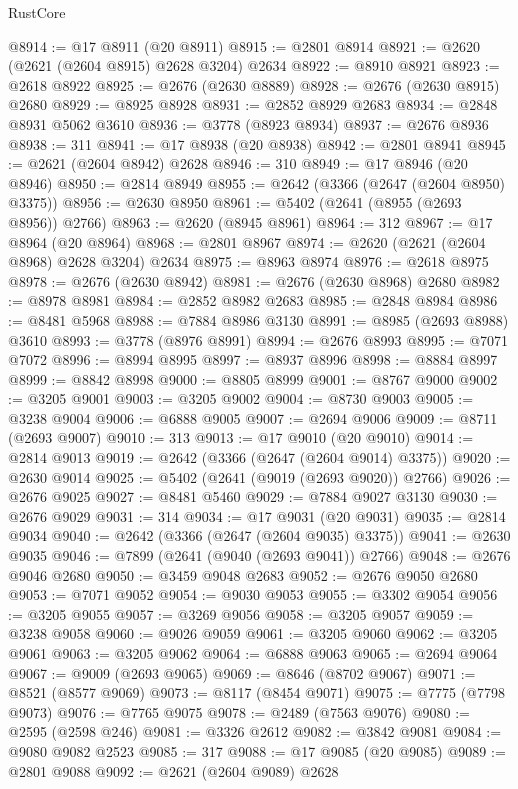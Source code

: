 \begin{lexlean}{RustCore}
\begin{coremodule}
@8914 := @17 @8911 (@20 @8911)
@8915 := @2801 @8914
@8921 := @2620 (@2621 (@2604 @8915) @2628 @3204) @2634
@8922 := @8910 @8921
@8923 := @2618 @8922
@8925 := @2676 (@2630 @8889)
@8928 := @2676 (@2630 @8915) @2680
@8929 := @8925 @8928
@8931 := @2852 @8929 @2683
@8934 := @2848 @8931 @5062 @3610
@8936 := @3778 (@8923 @8934)
@8937 := @2676 @8936
@8938 := 311
@8941 := @17 @8938 (@20 @8938)
@8942 := @2801 @8941
@8945 := @2621 (@2604 @8942) @2628
@8946 := 310
@8949 := @17 @8946 (@20 @8946)
@8950 := @2814 @8949
@8955 := @2642 (@3366 (@2647 (@2604 @8950) @3375))
@8956 := @2630 @8950
@8961 := @5402 (@2641 (@8955 (@2693 @8956)) @2766)
@8963 := @2620 (@8945 @8961)
@8964 := 312
@8967 := @17 @8964 (@20 @8964)
@8968 := @2801 @8967
@8974 := @2620 (@2621 (@2604 @8968) @2628 @3204) @2634
@8975 := @8963 @8974
@8976 := @2618 @8975
@8978 := @2676 (@2630 @8942)
@8981 := @2676 (@2630 @8968) @2680
@8982 := @8978 @8981
@8984 := @2852 @8982 @2683
@8985 := @2848 @8984
@8986 := @8481 @5968
@8988 := @7884 @8986 @3130
@8991 := @8985 (@2693 @8988) @3610
@8993 := @3778 (@8976 @8991)
@8994 := @2676 @8993
@8995 := @7071 @7072
@8996 := @8994 @8995
@8997 := @8937 @8996
@8998 := @8884 @8997
@8999 := @8842 @8998
@9000 := @8805 @8999
@9001 := @8767 @9000
@9002 := @3205 @9001
@9003 := @3205 @9002
@9004 := @8730 @9003
@9005 := @3238 @9004
@9006 := @6888 @9005
@9007 := @2694 @9006
@9009 := @8711 (@2693 @9007)
@9010 := 313
@9013 := @17 @9010 (@20 @9010)
@9014 := @2814 @9013
@9019 := @2642 (@3366 (@2647 (@2604 @9014) @3375))
@9020 := @2630 @9014
@9025 := @5402 (@2641 (@9019 (@2693 @9020)) @2766)
@9026 := @2676 @9025
@9027 := @8481 @5460
@9029 := @7884 @9027 @3130
@9030 := @2676 @9029
@9031 := 314
@9034 := @17 @9031 (@20 @9031)
@9035 := @2814 @9034
@9040 := @2642 (@3366 (@2647 (@2604 @9035) @3375))
@9041 := @2630 @9035
@9046 := @7899 (@2641 (@9040 (@2693 @9041)) @2766)
@9048 := @2676 @9046 @2680
@9050 := @3459 @9048 @2683
@9052 := @2676 @9050 @2680
@9053 := @7071 @9052
@9054 := @9030 @9053
@9055 := @3302 @9054
@9056 := @3205 @9055
@9057 := @3269 @9056
@9058 := @3205 @9057
@9059 := @3238 @9058
@9060 := @9026 @9059
@9061 := @3205 @9060
@9062 := @3205 @9061
@9063 := @3205 @9062
@9064 := @6888 @9063
@9065 := @2694 @9064
@9067 := @9009 (@2693 @9065)
@9069 := @8646 (@8702 @9067)
@9071 := @8521 (@8577 @9069)
@9073 := @8117 (@8454 @9071)
@9075 := @7775 (@7798 @9073)
@9076 := @7765 @9075
@9078 := @2489 (@7563 @9076)
@9080 := @2595 (@2598 @246)
@9081 := @3326 @2612
@9082 := @3842 @9081
@9084 := @9080 @9082 @2523
@9085 := 317
@9088 := @17 @9085 (@20 @9085)
@9089 := @2801 @9088
@9092 := @2621 (@2604 @9089) @2628

\end{coremodule}
\end{lexlean}
